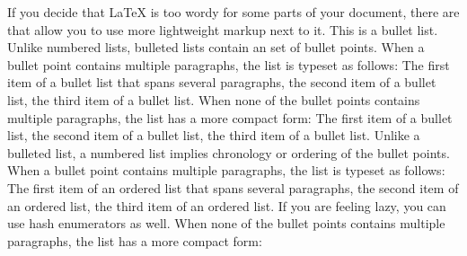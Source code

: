 If you decide that \LaTeX{} is too wordy for some parts of your document, there are  that allow you to use more lightweight markup next to it.\markdownRendererInterblockSeparator
{}\markdownRendererInterblockSeparator
{}This is a bullet list. Unlike numbered lists, bulleted lists contain an  set of bullet points. When a bullet point contains multiple paragraphs, the list is typeset as follows:\markdownRendererInterblockSeparator
{}\markdownRendererUlBegin
\markdownRendererUlItem The first item of a bullet list\markdownRendererInterblockSeparator
{}that spans several paragraphs,\markdownRendererUlItemEnd 
\markdownRendererUlItem the second item of a bullet list,\markdownRendererUlItemEnd 
\markdownRendererUlItem the third item of a bullet list.\markdownRendererUlItemEnd 
\markdownRendererUlEnd \markdownRendererInterblockSeparator
{}When none of the bullet points contains multiple paragraphs, the list has a more compact form:\markdownRendererInterblockSeparator
{}\markdownRendererUlBeginTight
\markdownRendererUlItem The first item of a bullet list,\markdownRendererUlItemEnd 
\markdownRendererUlItem the second item of a bullet list,\markdownRendererUlItemEnd 
\markdownRendererUlItem the third item of a bullet list.\markdownRendererUlItemEnd 
\markdownRendererUlEndTight \markdownRendererInterblockSeparator
{}Unlike a bulleted list, a numbered list implies chronology or ordering of the bullet points. When a bullet point contains multiple paragraphs, the list is typeset as follows:\markdownRendererInterblockSeparator
{}\markdownRendererOlBegin
{}The first item of an ordered list\markdownRendererInterblockSeparator
{}that spans several paragraphs,\markdownRendererOlItemEnd 
{}the second item of an ordered list,\markdownRendererOlItemEnd 
{}the third item of an ordered list.\markdownRendererOlItemEnd 
{}If you are feeling lazy,\markdownRendererOlItemEnd 
{}you can use hash enumerators as well.\markdownRendererOlItemEnd 
\markdownRendererOlEnd \markdownRendererInterblockSeparator
{}When none of the bullet points contains multiple paragraphs, the list has a more compact form:\markdownRendererInterblockSeparator
